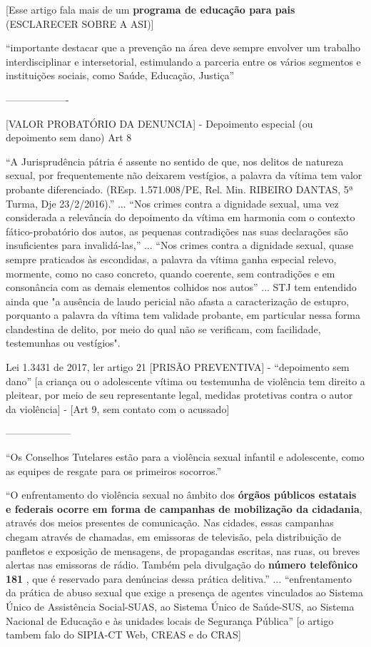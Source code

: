 [Esse artigo fala mais de um \textbf{programa de educação para pais} (ESCLARECER SOBRE A ASI)]

``importante  destacar  que  a  prevenção  na  área  deve  sempre  envolver  um trabalho interdisciplinar e intersetorial, estimulando a parceria entre os vários segmentos e instituições   sociais,   como   Saúde,   Educação,   Justiça'' \cite{pinto2017avaliaccao}


------------------- 
\cite{planalto13431}


[VALOR PROBATÓRIO DA DENUNCIA] - Depoimento especial (ou depoimento sem dano) Art 8


``A Jurisprudência pátria é assente no sentido de que, nos delitos de natureza sexual, por frequentemente não deixarem vestígios, a palavra da vítima tem valor probante diferenciado. (REsp. 1.571.008/PE, Rel. Min. RIBEIRO DANTAS, 5ª Turma, Dje 23/2/2016).'' 
...
``Nos crimes contra a dignidade sexual, uma vez considerada a relevância do depoimento da vítima em harmonia com o contexto fático-probatório dos autos, as pequenas contradições nas suas declarações são insuficientes para invalidá-las,''
...
``Nos crimes contra a dignidade sexual, quase sempre praticados às escondidas, a palavra da vítima ganha especial relevo, mormente, como no caso concreto, quando coerente, sem contradições e em consonância com as demais elementos colhidos nos autos''
...
STJ tem entendido ainda que "a ausência de laudo pericial não afasta a caracterização de estupro, porquanto a palavra da vítima tem validade probante, em particular nessa forma clandestina de delito, por meio do qual não se verificam, com facilidade, testemunhas ou vestígios".

Lei 1.3431 de 2017, ler artigo 21 [PRISÃO PREVENTIVA] - “depoimento sem dano” [a criança ou o adolescente vítima ou testemunha de violência tem direito a pleitear, por meio de seu representante legal, medidas protetivas contra o autor da violência] - [Art 9, sem contato com o acussado] \cite{planalto13431}

-------------------- 


``Os Conselhos Tutelares estão para a violência sexual infantil e adolescente, como as equipes de resgate para os primeiros socorros.'' \cite{caccia2014conselheiros}



``O enfrentamento do violência sexual no âmbito dos \textbf{órgãos públicos estatais e federais ocorre em forma de campanhas de mobilização da cidadania}, através dos meios presentes de comunicação. Nas cidades, essas campanhas chegam através de chamadas, em emissoras de televisão, pela distribuição de panfletos e exposição de mensagens, de propagandas escritas, nas ruas, ou breves alertas nas emissoras de rádio. Também pela divulgação do \textbf{número telefônico 181} , que é reservado para denúncias dessa prática delitiva.'' ... ``enfrentamento da prática de abuso sexual que exige a presença de agentes vinculados ao Sistema Único de Assistência Social-SUAS, ao Sistema Único de Saúde-SUS, ao Sistema Nacional de Educação e às unidades locais de Segurança Pública'' [o artigo tambem falo do SIPIA-CT Web, CREAS e do CRAS] \cite{caccia2014conselheiros}

